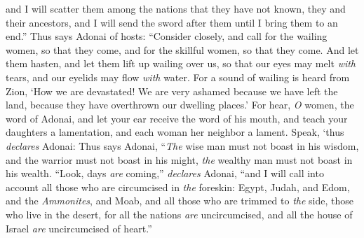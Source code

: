 \begin{biblechapter}
\verse and I will scatter them among the nations that they have not known, they and their ancestors, and I will send the sword after them until I bring them to an end.”
\verse Thus says Adonai of hosts:
\verse “Consider closely, and call for the wailing women, so that they come, 
and for the skillful women, so that they come.
\verse And let them hasten, 
and let them lift up wailing over us, 
so that our eyes may melt \textit{with} tears, 
and our eyelids may flow \textit{with} water.
\verse For a sound of wailing is heard from Zion, 
‘How we are devastated! 
We are very ashamed because we have left the land, 
because they have overthrown our dwelling places.’
\verse For hear, \textit{O} women, the word of Adonai, 
and let your ear receive the word of his mouth, 
and teach your daughters a lamentation, 
and each woman her neighbor a lament.
\verse Speak, ‘thus \textit{declares} Adonai:
 Thus says Adonai,
\verse “\textit{The} wise man must not boast in his wisdom, 
and the warrior must not boast in his might, 
\textit{the} wealthy man must not boast in his wealth.
 “Look, days \textit{are} coming,” \textit{declares} Adonai, “and I will call into account all those who are circumcised in \textit{the} foreskin:
\verse Egypt, Judah, and Edom, and the \textit{Ammonites}, and Moab, and all those who are trimmed to \textit{the} side, those who live in the desert, for all the nations \textit{are} uncircumcised, and all the house of Israel \textit{are} uncircumcised of heart.”
\end{biblechapter}

